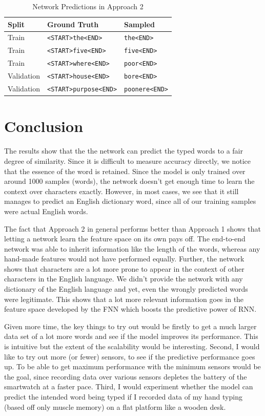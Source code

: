 \documentclass[10pt,twocolumn,letterpaper]{article}
\begin{document}
\begin{table}[t]
  \small
  \caption{Network Predictions in Approach 2}
  \label{rnn_predictions}
  \centering
  \begin{tabular}{l|l|l}
    \hline
    Split & Ground Truth & Sampled \\
    \hline
    Train & \verb'<START>the<END>' & \verb'the<END>'\\
    Train & \verb'<START>five<END>' & \verb'five<END>'\\
    Train & \verb'<START>where<END>' & \verb'poor<END>'\\
    Validation & \verb'<START>house<END>' & \verb'bore<END>'\\
    Validation & \verb'<START>purpose<END>' & \verb'poonere<END>'\\
    \hline
  \end{tabular}
\end{table}

\section{Conclusion}
The results show that the the network can predict the typed words to a fair degree of similarity. Since it is difficult to measure accuracy directly, we notice that the essence of the word is retained. Since the model is only trained over around 1000 samples (words), the network doesn't get enough time to learn the context over characters exactly. However, in most cases, we see that it still manages to predict an English dictionary word, since all of our training samples were actual English words.

The fact that Approach 2 in general performs better than Approach 1 shows that letting a network learn the feature space on its own pays off. The end-to-end network was able to inherit information like the length of the words, whereas any hand-made features would not have performed equally. Further, the network shows that characters are a lot more prone to appear in the context of other characters in the English language. We didn't provide the network with any dictionary of the English language and yet, even the wrongly predicted words were legitimate. This shows that a lot more relevant information goes in the feature space developed by the FNN which boosts the predictive power of RNN.

Given more time, the key things to try out would be firstly to get a much larger data set of a lot more words and see if the model improves its performance. This is intuitive but the extent of the scalability would be interesting. Second, I would like to try out more (or fewer) sensors, to see if the predictive performance goes up. To be able to get maximum performance with the minimum sensors would be the goal, since recording data over various sensors depletes the battery of the smartwatch at a faster pace. Third, I would experiment whether the model can predict the intended word being typed if I recorded data of my hand typing (based off only muscle memory) on a flat platform like a wooden desk.
\end{document}

